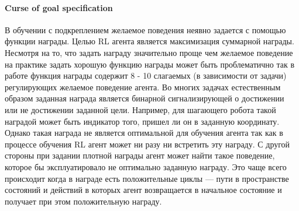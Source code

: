 \paragraph{Curse of goal specification}
В обучении с подкреплением желаемое поведения неявно задается с помощью функции награды. Целью RL агента является максимизация суммарной награды. Несмотря на то, что задать награду значительно проще чем желаемое поведение на практике задать хорошую функцию награды может быть проблематично так в работе \cite{hwangbo2019learning} функция награды содержит 8 - 10 слагаемых (в зависимости от задачи) регулирующих желаемое поведение агента. 
Во многих задачах естественным образом заданная награда является бинарной сигнализирующей о достижении или не достижении заданной цели. Например, для шагающего робота такой наградой может быть индикатор того, пришел ли он в заданную координату. Однако такая награда не является оптимальной для обучения агента так как в процессе обучения RL агент может ни разу ни встретить эту награду. 
С другой стороны при задании плотной награды агент может найти такое поведение, которое бы эксплуатировало не оптимально заданную награду. Это чаще всего происходит когда в награде есть положительные циклы --- пути в пространстве состояний и действий в которых агент возвращается в начальное состояние и получает при этом положительную награду. 




\FloatBarrier
